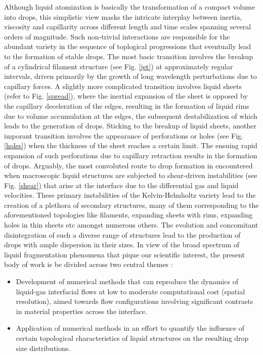 Although liquid atomization is basically the transformation of a compact volume into drops,
this simplistic view masks the intricate interplay between inertia, viscosity and capillarity across 
different length and time scales spanning several orders of magnitude.  
Such non-trivial interactions are responsible for the abundant variety in the sequence 
of toplogical progressions that eventually lead to the formation of stable drops. 
The most basic transition involves the breakup of a cylindrical filament structure 
(see Fig. \ref{jet}) at approximately regular intervals, driven primarily by the 
growth of long wavelength perturbations due to capillary forces. 
A slightly more complicated transition involves liquid sheets (refer to Fig. \ref{spread}), 
where the inertial expansion of the sheet is opposed by the capillary deceleration of the edges,
resulting in the formation of liquid rims due to volume accumulation at the edges, 
the subsequent destabilization of which leads to the generation of drops. 
Sticking to the breakup of liquid sheets, another imporant transition involves the  
appearance of perforations or holes (see Fig. \ref{holes}) when the thickness of the sheet reaches a certain limit. 
The ensuing rapid expansion of such perforations due to capillary retraction results in the formation of drops. 
Arguably, the most convoluted route to drop formation in encountered when macroscopic 
liquid structures are subjected to shear-driven instabilities (see Fig. \ref{shear}) that 
arise at the interface due to the differential gas and liquid velocities. 
These primary instabilities of the Kelvin-Helmholtz \cite{khi} variety lead to the creation 
of a plethora of secondary structures, many of them corresponding to the aforementioned 
topologies like filaments, expanding sheets with rims, expanding holes in thin sheets etc 
amongst numerous others. The evolution and concomitant disintegration of such a diverse range
of structures lead to the production of drops with ample dispersion in their sizes.  
In view of the broad spectrum of liquid fragmentation phenomena that pique our scientific interest, 
the present body of work is be divided across two central themes :  

\begin{itemize}
	\item Development of numerical methods that can reproduce the dynamics of liquid-gas interfacial flows
		at low to moderate computational cost (spatial resolution), aimed towards flow configurations 
		involving significant contrasts in material properties across the interface. 
	\item Application of numerical methods in an effort to quantify the influence of certain topological
		characteristics of liquid structures on the resulting drop size distributions.  
\end{itemize}

